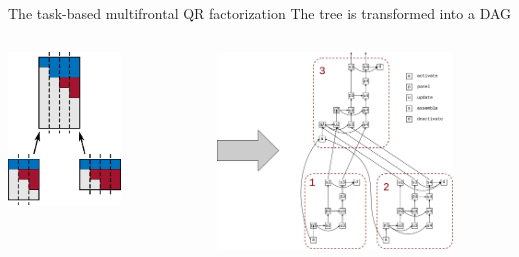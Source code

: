 \begin{frame}[fragile,t]{The task-based multifrontal QR factorization}
The tree is transformed into a DAG

\begin{columns}[t]
  \begin{column}{0.45\textwidth}
    \begin{center}
      \includegraphics[width=0.6\textwidth]{figures/tree_part}
    \end{center}
  \end{column}
  \begin{column}{0.55\textwidth}
    \begin{center}
      \includegraphics[width=0.8\textwidth]{figures/tree_dag}
    \end{center}
  \end{column}
\end{columns}


\end{frame}
